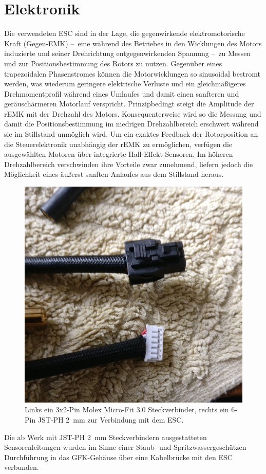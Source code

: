 \chapter{Elektronik}
	Die verwendeten ESC sind in der Lage, die gegenwirkende elektromotorische Kraft (Gegen-EMK) --~eine während des Betriebes in den Wicklungen des Motors induzierte und seiner Drehrichtung entgegenwirkenden Spannung --~zu Messen und zur Positionsbestimmung des Rotors zu nutzen.
	Gegenüber eines trapezoidalen Phasenstromes können die Motorwicklungen so sinusoidal bestromt werden, was wiederum geringere elektrische Verluste und ein gleichmäßigeres Drehmomentprofil während eines Umlaufes und damit einen sanfteren und geräuschärmeren Motorlauf verspricht.
	Prinzipbedingt steigt die Amplitude der rEMK mit der Drehzahl des Motors.
	Konsequenterweise wird so die Messung und damit die Positionsbestimmung im niedrigen Drehzahlbereich erschwert während sie im Stillstand unmöglich wird.
	Um ein exaktes Feedback der Rotorposition an die Steuerelektronik unabhängig der rEMK zu ermöglichen, verfügen die ausgewählten Motoren über integrierte Hall-Effekt-Sensoren.
	Im höheren Drehzahlbereich verschwinden ihre Vorteile zwar zunehmend, liefern jedoch die Möglichkeit eines äußerst sanften Anlaufes aus dem Stillstand heraus.\par\medskip
	\begin{figure}
		\centering
		\includegraphics[angle=90, width=.4\textwidth]{Footage/Pictures/Hall sensor connector.jpg}
		\caption[Hall-Sensoren Steckverbinder]{Links ein 3x2-Pin Molex Micro-Fit 3.0 Steckverbinder, rechts ein 6-Pin JST-PH \qty{2}{\milli\metre} zur Verbindung mit dem ESC.}
		\label{fig:hall sensor connectors}
	\end{figure}
	Die ab Werk mit JST-PH \qty{2}{\milli\metre} Steckverbindern ausgestatteten Sensorenleitungen wurden im Sinne einer Staub- und Spritzwassergeschützen Durchführung in das GFK-Gehäuse über eine Kabelbrücke mit den ESC verbunden.

